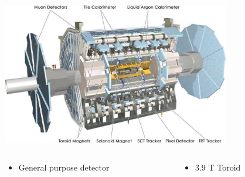 \documentclass{beamer}
\newcommand*{\header}[1]{\fontsize{16}{8}\selectfont \textbf{{\color{MyPurple}{#1}}}}
\begin{document}
\begin{frame}
\begin{center}
\header{The ATLAS Detector}
\end{center}
\begin{center}
\includegraphics[width=0.75\textwidth]{figures/ATLAS_det}
\end{center}
\begin{columns}
\begin{column}{0.5\textwidth}
\begin{itemize}
\item General purpose detector
\end{itemize}
\end{column}
\begin{column}{0.5\textwidth}
\begin{itemize}
\item 3.9 T Toroid
\end{itemize}
\end{column}
\end{columns}
\end{frame}
\end{document}
